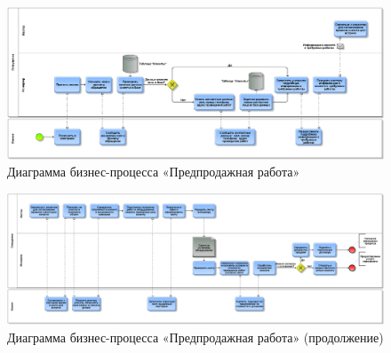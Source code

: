 \documentclass[a4paper,12pt]{article}
\begin{document}
\begin{figure}[h]
    \centering
    \includegraphics[width=\linewidth]{pred1.png}
    \caption{Диаграмма бизнес-процесса «Предпродажная работа»}
    \label{fig:pred1}
\end{figure}
\begin{figure}[h]
    \centering
    \includegraphics[width=\linewidth]{pred2.png}
    \caption{Диаграмма бизнес-процесса «Предпродажная работа» (продолжение)}
    \label{fig:pred2}
\end{figure}
\end{document}
